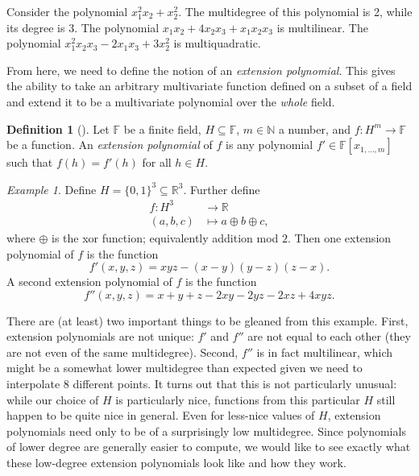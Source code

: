 \documentclass[english,12pt]{reedthesis}
\theoremstyle{plain}
\theoremstyle{definition}
\newtheorem{defn}[defn]{Definition}
\theoremstyle{remark}
\newtheorem{example}{Example}[thm]
\begin{document}
Consider the polynomial $x_{1}^{2}x_{2} + x_{2}^{2}$. The multidegree of this
polynomial is 2, while its degree is 3. The polynomial
$x_{1}x_{2} + 4x_{2}x_{3} + x_{1}x_{2}x_{3}$ is multilinear. The polynomial
$x_{1}^{2}x_{2}x_{3} - 2x_{1}x_{3} + 3x_{2}^{2}$ is multiquadratic.

From here, we need to define the notion of an \emph{extension polynomial}. This
gives the ability to take an arbitrary multivariate function defined on a subset
of a field and extend it to be a multivariate polynomial over the \emph{whole}
field.

\begin{defn}[{\cite[8]{AW09}}]\label{def:ext-poly}
  Let $\mathbb{F}$ be a finite field, $H \subseteq \mathbb{F}$, $m \in \mathbb{N}$ a number, and
  $f\colon H^{m} \rightarrow \mathbb{F}$ be a function. An \emph{extension polynomial} of
  $f$ is any polynomial $f' \in \mathbb{F}[x_{1, \ldots, m}]$ such that $f(h) = f'(h)$
  for all $h \in H$.
\end{defn}

\begin{example}
  Define $H = \{0, 1\}^{3} \subseteq \mathbb{R}^{3}$. Further define
  \begin{align*}
    f\colon H^{3} &\rightarrow \mathbb{R} \\
    (a, b, c) &\mapsto a \oplus b \oplus c,
  \end{align*}
  where $\oplus$ is the xor function; equivalently addition mod $2$. Then one
  extension polynomial of $f$ is the function
  \begin{equation*}
    f'(x, y, z) = xyz - (x - y)(y - z)(z - x).
  \end{equation*}
  A second extension polynomial of $f$ is the function
  \begin{equation*}
    f''(x, y, z) = x + y + z - 2xy - 2yz - 2xz + 4xyz.
  \end{equation*}
\end{example}

There are (at least) two important things to be gleaned from this example.
First, extension polynomials are not unique: $f'$ and $f''$ are not equal to
each other (they are not even of the same multidegree). Second, $f''$ is in fact
multilinear, which might be a somewhat lower multidegree than expected given we
need to interpolate 8 different points. It turns out that this is not
particularly unusual: while our choice of $H$ is particularly nice, functions
from this particular $H$ still happen to be quite nice in general. Even for
less-nice values of $H$, extension polynomials need only to be of a surprisingly
low multidegree. Since polynomials of lower degree are generally easier to
compute, we would like to see exactly what these low-degree extension
polynomials look like and how they work.
\end{document}
